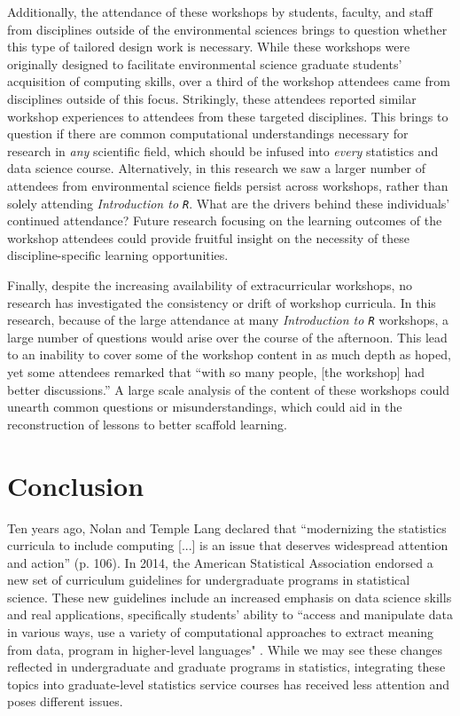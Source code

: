 \documentclass[12pt]{article}
\begin{document}
\quad Additionally, the attendance of these workshops by students, faculty, and
staff from disciplines outside of the environmental sciences brings to question
whether this type of tailored design work is necessary. While these workshops
were originally designed to facilitate environmental science graduate students'
acquisition of computing skills, over a third of the workshop attendees came
from disciplines outside of this focus. Strikingly, these attendees reported
similar workshop experiences to attendees from these targeted disciplines. This
brings to question if there are common computational understandings necessary
for research in \emph{any} scientific field, which should be infused into
\emph{every} statistics and data science course. Alternatively, in this research
we saw a larger number of attendees from environmental science fields persist
across workshops, rather than solely attending \emph{Introduction to 
\texttt{R}}. What are the drivers behind these individuals' continued
attendance? Future research focusing on the learning outcomes of the workshop
attendees could provide fruitful insight on the necessity of these
discipline-specific learning opportunities. 

\quad Finally, despite the increasing availability of extracurricular 
workshops, no research has investigated the consistency or drift of workshop
curricula. In this research, because of the large attendance at many
\emph{Introduction to \texttt{R}} workshops, a large number of questions would
arise over the course of the afternoon. This lead to an inability to cover some
of the workshop content in as much depth as hoped, yet some attendees remarked 
that ``with so many people, [the workshop] had better discussions.'' A large 
scale analysis of the content of these workshops could unearth common questions 
or misunderstandings, which could aid in the reconstruction of lessons to better
scaffold learning. 

\section{Conclusion}
\label{sec:conclusion}

\quad Ten years ago, Nolan and Temple Lang declared that ``modernizing the
statistics curricula to include computing [...] is an issue that deserves
widespread attention and action'' (p. 106). In 2014, the American Statistical
Association endorsed a new set of curriculum guidelines for undergraduate
programs in statistical science. These new guidelines include an increased
emphasis on data science skills and real applications, specifically students'
ability to ``access and manipulate data in various ways, use a variety of
computational approaches to extract meaning from data, program in higher-level
languages" \citep[p. 7]{asa}. While we may see these changes reflected in
undergraduate and graduate programs in statistics, integrating these topics into
graduate-level statistics service courses has received less attention and poses
different issues. 
\end{document}
